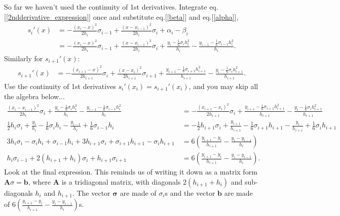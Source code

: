 \documentclass[paper=a4,fontsize=11pt]{scrartcl} %
\begin{document}
So far we haven't used the continuity of 1st derivatives. Integrate eq.[\ref{2ndderivative_expression}] once and substitute eq.[\ref{beta}] and eq.[\ref{alpha}],
\begin{align}\label{1stderivative_expression}
    s_i'(x) & = -\frac{(x_i - x)^2}{2h_i}\sigma_{i-1} + \frac{(x - x_{i-1})^2}{2h_i}\sigma_{i} + \alpha_i - \beta_i \\
    & = -\frac{(x_i - x)^2}{2h_i}\sigma_{i-1} + \frac{(x - x_{i-1})^2}{2h_i}\sigma_{i} + \frac{y_{i}-\frac{1}{6}\sigma_{i}h_i^2}{h_i} - \frac{y_{i-1}-\frac{1}{6}\sigma_{i-1}h_i^2}{h_i}.
\end{align}
Similarly for $s_{i+1}'(x)$:
\begin{align}\label{1stderivative_expression}
    s_{i+1}'(x) & = -\frac{(x_{i+1} - x)^2}{2h_{i+1}}\sigma_{i} + \frac{(x - x_{i})^2}{2h_{i+1}}\sigma_{i+1} + \frac{y_{i+1}-\frac{1}{6}\sigma_{i+1}h_{i+1}^2}{h_{i+1}} - \frac{y_{i}-\frac{1}{6}\sigma_{i}h_{i+1}^2}{h_{i+1}}.
\end{align}
Use the continuity of 1st derivatives $s_i'(x_{i}) = s_{i+1}'(x_{i})$, and you may skip all the algebra below...
\begin{equation}\label{1st_dev_continuity}
\begin{split}
    \frac{(x_i - x_{i-1})^2}{2h_i}\sigma_{i} + \frac{y_{i}-\frac{1}{6}\sigma_{i}h_i^2}{h_i} - \frac{y_{i-1}-\frac{1}{6}\sigma_{i-1}h_i^2}{h_i} &= -\frac{(x_{i+1} - x_i)^2}{2h_{i+1}}\sigma_{i} + \frac{y_{i+1}-\frac{1}{6}\sigma_{i+1}h_{i+1}^2}{h_{i+1}} - \frac{y_{i}-\frac{1}{6}\sigma_{i}h_{i+1}^2}{h_{i+1}}\\
    \frac{1}{2}h_i\sigma_{i} + \frac{y_{i}}{h_i}-\frac{1}{6}\sigma_{i}h_i - \frac{y_{i-1}}{h_i}+\frac{1}{6}\sigma_{i-1}h_i &= -\frac{1}{2}h_{i+1}\sigma_{i} + \frac{y_{i+1}}{h_{i+1}}-\frac{1}{6}\sigma_{i+1}h_{i+1} - \frac{y_{i}}{h_{i+1}}+\frac{1}{6}\sigma_{i}h_{i+1}\\
    3h_i\sigma_{i} -\sigma_{i}h_i +\sigma_{i-1}h_i+ 3h_{i+1}\sigma_{i} + \sigma_{i+1}h_{i+1} - \sigma_{i}h_{i+1}\ &= 6\left(\frac{y_{i+1}-y_i}{h_{i+1}}  -\frac{y_{i}-y_{i-1}}{h_i}\right)\\
    h_i\sigma_{i-1} + 2(h_{i+1}+h_i)\sigma_i+ h_{i+1}\sigma_{i+1}&=6\left(\frac{y_{i+1}-y_i}{h_{i+1}}  -\frac{y_{i}-y_{i-1}}{h_i}\right).
\end{split}
\end{equation}
Look at the final expression. This reminds us of writing it down as a matrix form $\mathbf{A}{\sigma}= \mathbf{b}$, where $\mathbf{A}$ is a tridiagonal matrix, with diagonals $2(h_{i+1}+h_i)$ and sub-diagonals $h_i$ and $h_{i+1}$. The vector $\mathbf{\sigma}$ are made of $\sigma_i$s and the vector $\mathbf{b}$ are made of $6\left(\frac{y_{i+1}-y_i}{h_{i+1}}  -\frac{y_{i}-y_{i-1}}{h_i}\right)$s. 
\end{document}
